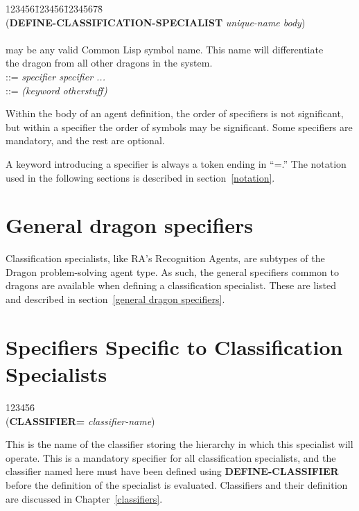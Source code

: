 \begin{tabbing}
123456\=123456\=12345678\= \kill
\\
\>({\bf DEFINE-CLASSIFICATION-SPECIALIST} {\it unique-name  body}) \\
\\
\> may be any valid Common Lisp symbol name. This
name will differentiate\\
\>\>\>the dragon from all other dragons in the system. \\
\> \>::= {\it specifier specifier ...} \\
\>\> ::= {\it (keyword otherstuff)}
\\
\end{tabbing}
Within the body of an agent definition, the order of specifiers is not
significant, but within a specifier the order of symbols may be significant.
Some specifiers are mandatory, and the rest are optional.

A keyword introducing a specifier is always a token ending in ``=.''
The notation used in the following sections is described in
section~\ref{notation}.

\section{General dragon specifiers}

Classification specialists, like RA's Recognition Agents, are subtypes
of the Dragon problem-solving agent type. As such, the general specifiers
common to dragons are available when defining a classification specialist.
These are listed and described in section~\ref{general dragon specifiers}.

\section{Specifiers Specific to Classification Specialists}

\begin{tabbing}
123456\= \kill
\\
({\bf CLASSIFIER=} {\it classifier-name\/}) \\
\end{tabbing}
This is the name of the classifier storing the hierarchy in which
this specialist will operate. This is a mandatory specifier for
all classification specialists, and the classifier named here
must have been defined using {\bf DEFINE-CLASSIFIER} before
the definition of the specialist is evaluated. Classifiers
and their definition are discussed in Chapter~\ref{classifiers}.


